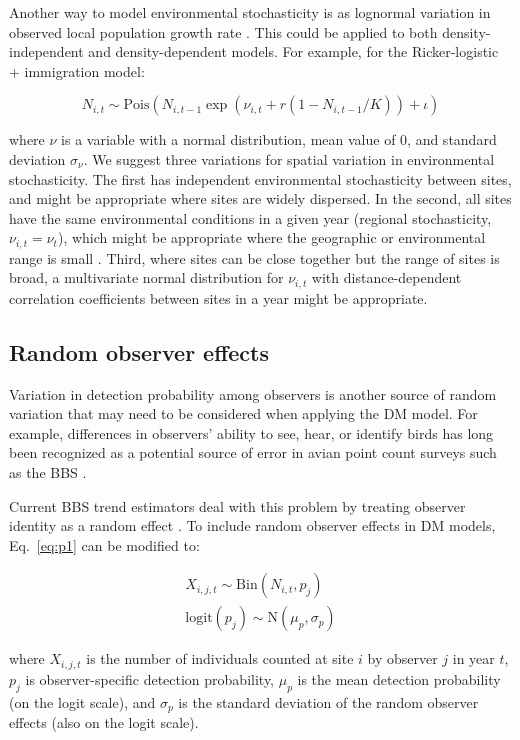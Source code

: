 \documentclass[12pt,english]{article}
\begin{document}
\begin{spacing}{1.9}
\begin{flushleft}
Another way to model environmental stochasticity is as lognormal variation in observed local population 
growth rate \citep{bjornstad:2001,bonsall_hastings:2004}.  This could be applied to both density-independent and density-dependent models.
For example, for the Ricker-logistic + immigration model:
\begin{linenomath*}
\begin{equation}
N_{i,t} \sim
\mathrm{Pois}(N_{i,t-1}\exp(\nu_{i,t} + r(1-N_{i,t-1}/K)) + \iota)
\label{eq:nuRand}
\end{equation}
\end{linenomath*}
where $\nu$ is a variable with a normal distribution, mean value of 0, and standard deviation $\sigma_\nu$.  
We suggest three variations for spatial variation in environmental stochasticity.  The first has independent environmental stochasticity 
between sites, and might be appropriate where sites are widely dispersed.  In the second, 
all sites have the same environmental conditions in a given year (regional stochasticity, $\nu_{i,t} = \nu_{t}$),
which might be appropriate where the geographic or environmental range is small \citep{hanski:1998}.  
Third, where sites can be close together but the range of sites is broad, a multivariate normal distribution 
for $\nu_{i,t}$ with distance-dependent correlation coefficients 
between sites in a year might be appropriate.

\subsection*{Random observer effects}

Variation in detection probability among observers is another
source of random variation that may need to be considered when applying
the DM model. For example, differences in observers' ability to see,
hear, or identify birds has long been recognized as a potential source of error
in avian point count surveys such as the BBS 
\citep{robbins_etal:1986,sauer_etal:1994auk,campbell_francis:2011}.

Current BBS trend estimators deal with this problem by
treating observer identity as a random 
effect \citep{link_sauer:2002,sauer_link:2011}.
To include random observer effects in DM models, 
Eq.~\ref{eq:p1} can be modified to:
\begin{linenomath*}
\begin{gather}
X_{i,j,t} \sim \mathrm{Bin}(N_{i,t}, p_j) \nonumber \\
\mathrm{logit}(p_j) \sim \mathrm{N}(\mu_p, \sigma_p)
\label{eq:pobs}
\end{gather}
\end{linenomath*}
where $X_{i,j,t}$ is the number of individuals counted at site $i$ by
observer $j$ in year $t$, $p_j$ is observer-specific detection probability,
$\mu_p$ is the mean detection probability (on the logit scale), and $\sigma_p$ is
the standard deviation of the random observer effects (also on the logit scale). 


\end{flushleft}
\end{spacing}
\end{document}
